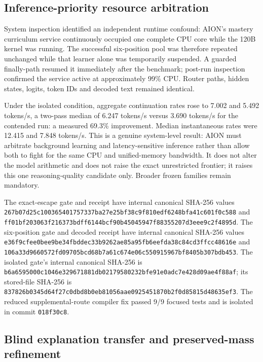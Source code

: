 \subsection{Inference-priority resource arbitration}

System inspection identified an independent runtime confound: AION's mastery
curriculum service continuously occupied one complete CPU core while the 120B
kernel was running.  The successful six-position pool was therefore repeated
unchanged while that learner alone was temporarily suspended.  A guarded
finally-path resumed it immediately after the benchmark; post-run inspection
confirmed the service active at approximately 99\% CPU.  Router paths, hidden
states, logits, token IDs and decoded text remained identical.

Under the isolated condition, aggregate continuation rates rose to 7.002 and
5.492 tokens/s, a two-pass median of 6.247 tokens/s versus 3.690 tokens/s for
the contended run: a measured 69.3\% improvement.  Median instantaneous rates
were 12.415 and 7.848 tokens/s.  This is a genuine system-level result: AION
must arbitrate background learning and latency-sensitive inference rather than
allow both to fight for the same CPU and unified-memory bandwidth.  It does
not alter the model arithmetic and does not raise the exact unrestricted
frontier; it raises this one reasoning-quality candidate only.  Broader frozen
families remain mandatory.

The exact-escape gate and receipt have internal canonical SHA-256 values
\texttt{267b07d25c100365401757337ba27e25bf38c9f810edf6248bfa41c601f0c588}
and
\texttt{ff01bf203063f216373bdff6144bcf90b45045947f88355207d3eee9c2f4895d}.
The six-position gate and decoded receipt have internal canonical SHA-256
values
\texttt{e36f9cfee0bee9be34fbddec33b9262ae85a95fb6eefda38c84cd3ffcc48616e}
and
\texttt{106a33d9660572fd09705bcd68b7a61c674e06c550915967bf8405b307bdb453}.
The isolated gate's internal canonical SHA-256 is
\texttt{b6a6595000c1046e329671881db02179580232bfe91e0adc7e428d09ae4f88af};
its stored-file SHA-256 is
\texttt{837826b0345d64f27c0dbd8b0eb81056aae0925451870b2f0d85815d48635ef3}.
The reduced supplemental-route compiler fix passed 9/9 focused tests and is
isolated in commit \texttt{018f30c8}.

\subsection{Blind explanation transfer and preserved-mass refinement}

